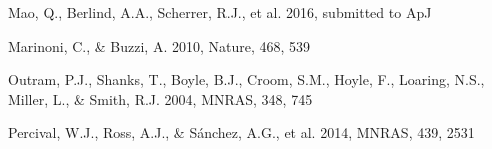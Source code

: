 \documentclass[iop]{emulateapj}
\begin{document}
\begin{thebibliography}{}
Mao, Q., Berlind, A.A., Scherrer, R.J., et al. 2016, submitted to ApJ

Marinoni, C., \& Buzzi, A. 2010, Nature, 468, 539  





Outram, P.J., Shanks, T., Boyle, B.J., Croom, S.M., Hoyle, F., Loaring, N.S., 
Miller, L., \& Smith, R.J. 2004, MNRAS, 348, 745  









Percival, W.J., Ross, A.J., \& S\'{a}nchez, A.G., et al. 2014, MNRAS, 439, 2531






\end{thebibliography}
\end{document}
